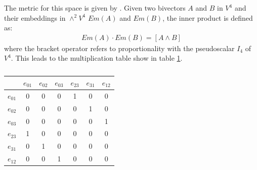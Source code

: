 \documentclass[a4paper, 10pt]{article}
\begin{document}
The metric for this space is given by \cite{hangbo2011}. Given two bivectors $A$
and $B$ in $V^4$ and their embeddings in $\wedge^2 V^4$ $Em(A)$ and $Em(B)$, the
inner product is defined as:
\begin{align*}
  Em(A) \cdot Em(B) = [A \wedge B]
\end{align*}
where the bracket operator refers to proportionality with the pseudoscalar $I_4$
of $V^4$. This leads to the multiplication table show in table \ref{table:mult}.
\begin{table}
  \centering
  \begin{tabular}{|c | c c c | c c c|}
    \hline
    & $e_{01}$ & $e_{02}$ & $e_{03}$ & $e_{23}$ & $e_{31}$ & $e_{12}$ \\
    \hline
    $e_{01}$ & 0 & 0 & 0 & 1 & 0 & 0 \\
    $e_{02}$ & 0 & 0 & 0 & 0 & 1 & 0 \\
    $e_{03}$ & 0 & 0 & 0 & 0 & 0 & 1 \\
    \hline
    $e_{23}$ & 1 & 0 & 0 & 0 & 0 & 0 \\
    $e_{31}$ & 0 & 1 & 0 & 0 & 0 & 0 \\
    $e_{12}$ & 0 & 0 & 1 & 0 & 0 & 0 \\
    \hline
  \end{tabular}
  \caption{}
  \label{table:mult}
\end{table}
\end{document}
